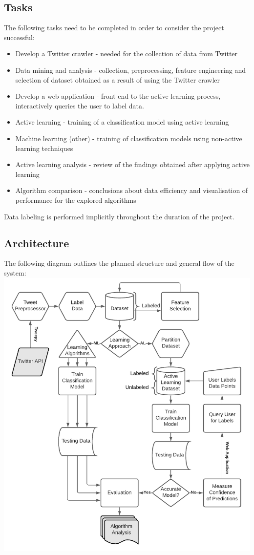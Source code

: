 \documentclass[a4paper,12pt]{article}
\begin{document}
\subsection{Tasks}
The following tasks need to be completed in order to consider the project successful:
\begin{itemize}
    \item Develop a Twitter crawler - needed for the collection of data from Twitter
    \item Data mining and analysis - collection, preprocessing, feature engineering and selection of dataset obtained as a result of using the Twitter crawler
    \item Develop a web application - front end to the active learning process, interactively queries the user to label data.
    \item Active learning - training of a classification model using active learning
    \item Machine learning (other) - training of classification models using non-active learning techniques
    \item Active learning analysis - review of the findings obtained after applying active learning 
    \item Algorithm comparison - conclusions about data efficiency and visualisation of performance for the explored algorithms
\end{itemize}
Data labeling is performed implicitly throughout the duration of the project.
\subsection{Architecture}
The following diagram outlines the planned structure and general flow of the system:
\includegraphics[scale=0.84]{Active Learning.pdf}
\end{document}

